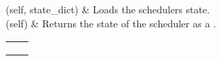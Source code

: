 \documentclass[letterpaper,10pt,english]{sphinxmanual}
\begin{document}
\begin{fulllineitems}
\begin{savenotes}\sphinxatlongtablestart\begin{longtable}[c]{}
\hline

\endfirsthead

%
{}\\
\hline

\endhead

\hline
{}\\
\endfoot

\endlastfoot

(self, state\_dict)
&
Loads the schedulers state.
\\
\hline
{}(self)
&
Returns the state of the scheduler as a .
\\
\hline
\end{longtable}\sphinxatlongtableend\end{savenotes}


\begin{savenotes}\sphinxattablestart
\centering
\begin{tabulary}{\linewidth}[t]{|T|T|}
\hline

&\\
\hline
{}
&\\
\hline
{}
&\\
\hline
{}
&\\
\hline
\end{tabulary}
\par
\sphinxattableend\end{savenotes}

\end{fulllineitems}

\end{document}
